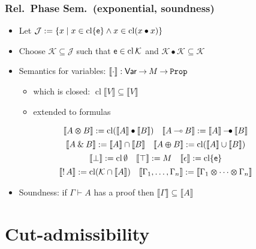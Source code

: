 \documentclass[xcolor=pdftex,graphicx=pdftex,12pt]{beamer}
\newcommand{\coq}[1]{\ensuremath{\mathalpha{\mathtt{#1}}}}
\newcommand{\sem}[1]{\llbracket{#1}\rrbracket}
\newcommand{\cfun}{\mathbin{\rightarrow}}
\newcommand{\Prop}{\coq{Prop}}
\newcommand{\cdef}{\mathrel{\mathtt{:=}}}
\newcommand{\seq}{\mathrel\vdash}
\newcommand{\lwith}{\mathbin{\text{\upshape \&}}}
\newcommand{\lplus}{\mathbin{\varoplus}}
\newcommand{\ltime}{\mathbin{\varotimes}}
\newcommand{\lunit}{\mathalpha{\epsilon}}
\newcommand{\limp}{\mathbin{\multimap}}
\newcommand{\ltop}{\mathalpha{\top}}
\newcommand{\lbot}{\mathalpha{\bot}}
\newcommand{\lbang}{\mathop{!}}
\newcommand{\cl}{\mathop{\mathrm{cl}}}
\newcommand{\mmult}{\mathbin{\bullet}}
\newcommand{\mimp}{\mathbin{\multimap\mskip -14mu\bullet}}
\newcommand{\munit}{\mathalpha{\mathsf e}}
\newcommand{\set}[1]{\mathcal{#1}}
\begin{document}
\begin{frame}

\frametitle{Rel.\ Phase Sem.\ (exponential, soundness)}

\begin{itemize}
\item Let $\set J \cdef \{x \mid x\in\cl\{\munit\} \wedge x\in\cl(x\mmult x)\}$
\item Choose $\set K\subseteq \set J$ such that $\munit\in\cl\set K$ and $\set K\mmult\set K\subseteq\set K$ 
\item Semantics for variables: $\sem\cdot:\mathsf{Var}\cfun M\cfun\Prop$
  \begin{itemize}
  \item which is closed: $\cl\sem{V}\subseteq \sem V$
  \item extended to formulas
  \end{itemize} 
\end{itemize}

\vspace{-0.5cm}

$$
\begin{array}{c}
\sem{A\ltime B}\cdef\cl(\sem A\mmult\sem B)\quad \sem{A\limp B}\cdef \sem A\mimp\sem B\\[1ex]
\sem{A\lwith B}\cdef \sem A\cap\sem B \quad \sem{A\lplus B}\cdef \cl(\sem A\cup\sem B)\\[1ex]
\sem{\lbot}\cdef \cl\emptyset\quad \sem\ltop\cdef M\quad \sem\lunit\cdef\cl\{\munit\}\\[1ex]
\sem{\lbang A} \cdef \cl(\set K\cap\sem A)\quad \sem{\Gamma_1,\ldots,\Gamma_n}\cdef\sem{\Gamma_1\ltime\cdots\ltime\Gamma_n}
\end{array}
$$

\begin{itemize}
\item Soundness: if $\Gamma\seq A$ has a proof then $\sem\Gamma\subseteq\sem A$
\end{itemize}

\end{frame}

\section{Cut-admissibility}

\newcommand{\ulist}[1]{\lfloor#1\rfloor}
\end{document}
